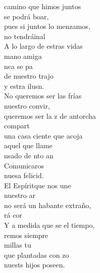 \documentclass[12pt]{article}
\begin{document}
\begin{multicols*}{2}
\begin{cancion}%
	 camino que himos juntos\\
	 se podrá boar,\\
	pues si juntos lo menzamos,\\
	 no tendráinal\\
	A lo largo de estras vidas\\
	 mano amiga\\
	nca se pa\\
	de nuestro trajo\\
	y estra ilusn. \\
\jump
	No queremos ser las frías\\
	 nuestro convir,\\
	queremos ser la z de antorcha\\
	 compart  \\
	una casa ciente que acoja\\
	aquel que llame\\
	nsado de nto an\\
	Comunicaros\\
	nuesa felicid.\\
\jump
	El Espíritque nos une\\
	 nuestro ar\\
	no será un habante extraño,\\
	rá cor\\
	Y a medida que se el tiempo,\\
	remos siempre\\
	millas  tu \\
	que plantadas con zo\\
	nuests hijos poseen. \\
\end{cancion}%


\end{multicols*}
\end{document}
